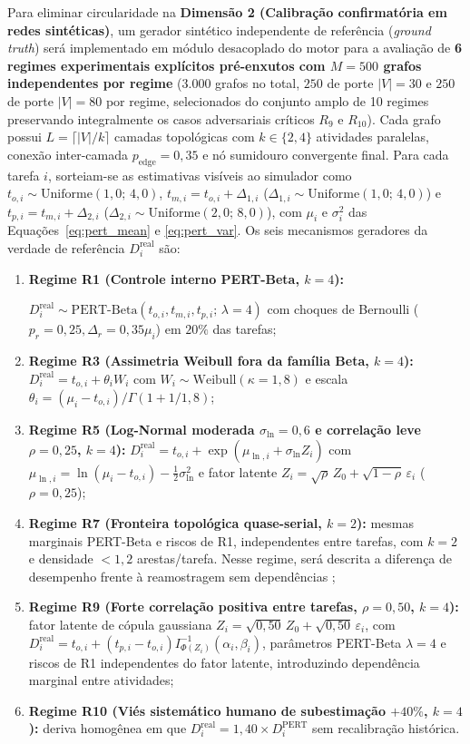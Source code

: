 \documentclass[12pt,openany,oneside,a4paper,english,brazilian,sumario=tradicional]{abntex2}
\begin{document}
Para eliminar circularidade na \textbf{Dimensão 2 (Calibração confirmatória em redes sintéticas)}, um gerador sintético independente de referência (\textit{ground truth}) será implementado em módulo desacoplado do motor para a avaliação de \textbf{6 regimes experimentais explícitos pré-enxutos com $M=500$ grafos independentes por regime} ($3.000$ grafos no total, $250$ de porte $|V|=30$ e $250$ de porte $|V|=80$ por regime, selecionados do conjunto amplo de 10 regimes preservando integralmente os casos adversariais críticos $R_9$ e $R_{10}$). Cada grafo possui $L = \lceil |V|/k \rceil$ camadas topológicas com $k \in \{2, 4\}$ atividades paralelas, conexão inter-camada $p_{\text{edge}}=0{,}35$ e nó sumidouro convergente final. Para cada tarefa $i$, sorteiam-se as estimativas visíveis ao simulador como $t_{o,i} \sim \mathrm{Uniforme}(1{,}0;\,4{,}0)$, $t_{m,i} = t_{o,i} + \Delta_{1,i}$ ($\Delta_{1,i} \sim \mathrm{Uniforme}(1{,}0;\,4{,}0)$) e $t_{p,i} = t_{m,i} + \Delta_{2,i}$ ($\Delta_{2,i} \sim \mathrm{Uniforme}(2{,}0;\,8{,}0)$), com $\mu_i$ e $\sigma_i^2$ das Equações~\ref{eq:pert_mean} e \ref{eq:pert_var}. Os seis mecanismos geradores da verdade de referência $D_i^{\mathrm{real}}$ são:
\begin{enumerate}
  \item \textbf{Regime R1 (Controle interno PERT-Beta, $k=4$):}\par\noindent $D_i^{\mathrm{real}} \sim \mathrm{PERT\text{-}Beta}(t_{o,i}, t_{m,i}, t_{p,i};\,\lambda=4)$ com choques de Bernoulli ($p_r=0{,}25, \Delta_r=0{,}35\mu_i$) em $20\%$ das tarefas;
  \item \textbf{Regime R3 (Assimetria Weibull fora da família Beta, $k=4$):} $D_i^{\mathrm{real}} = t_{o,i} + \theta_i W_i$ com $W_i \sim \mathrm{Weibull}(\kappa=1{,}8)$ e escala $\theta_i = (\mu_i - t_{o,i})/\Gamma(1 + 1/1{,}8)$;
  \item \textbf{Regime R5 (Log-Normal moderada $\sigma_{\ln}=0{,}6$ e correlação leve $\rho=0{,}25$, $k=4$):} $D_i^{\mathrm{real}} = t_{o,i} + \exp(\mu_{\ln,i} + \sigma_{\ln} Z_i)$ com $\mu_{\ln,i} = \ln(\mu_i - t_{o,i}) - \frac{1}{2}\sigma_{\ln}^2$ e fator latente $Z_i = \sqrt{\rho}\,Z_0 + \sqrt{1-\rho}\,\varepsilon_i$ ($\rho=0{,}25$);
  \item \textbf{Regime R7 (Fronteira topológica quase-serial, $k=2$):} mesmas marginais PERT-Beta e riscos de R1, independentes entre tarefas, com $k=2$ e densidade $< 1{,}2$ arestas/tarefa. Nesse regime, será descrita a diferença de desempenho frente à reamostragem sem dependências \cite{vacanti2015};
  \item \textbf{Regime R9 (Forte correlação positiva entre tarefas, $\rho=0{,}50$, $k=4$):} fator latente de cópula gaussiana $Z_i = \sqrt{0{,}50}\,Z_0 + \sqrt{0{,}50}\,\varepsilon_i$, com $D_i^{\mathrm{real}}=t_{o,i}+(t_{p,i}-t_{o,i})I^{-1}_{\Phi(Z_i)}(\alpha_i,\beta_i)$, parâmetros PERT-Beta $\lambda=4$ e riscos de R1 independentes do fator latente, introduzindo dependência marginal entre atividades;
  \item \textbf{Regime R10 (Viés sistemático humano de subestimação $+40\%$, $k=4$):} deriva homogênea em que $D_i^{\mathrm{real}} = 1{,}40 \times D_i^{\mathrm{PERT}}$ sem recalibração histórica.
\end{enumerate}
\end{document}
